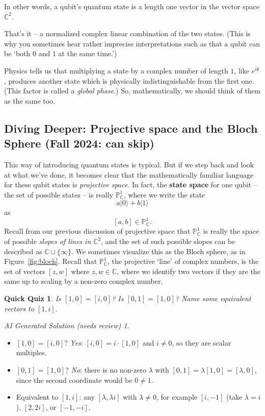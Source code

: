 \documentclass{article}
\theoremstyle{plain}
\newtheorem{quiz}[theorem]{Quick Quiz}
\theoremstyle{definition}
\theoremstyle{remark}
\newtheorem*{aisolution}{AI Generated Solution (needs review)}
\numberwithin{theorem}{section}
\newcommand{\CC}{\mathbb{C}}
\newcommand{\PP}{\mathbb{P}}
\begin{document}
In other words, a qubit's quantum state is a length one vector in the vector space $\mathbb{C}^2$.

That's it -- a normalized complex linear combination of the two states.  (This is why you sometimes hear rather imprecise interpretations such as that a qubit can be `both $0$ and $1$ at the same time.')

Physics tells us that multiplying a state by a complex number of length $1$, like $e^{i\theta}$, produces another state which is physically indistinguishable from the first one.  (This factor is called a \emph{global phase}.)  So, mathematically, we should think of them as the same too.





\subsection{Diving Deeper:  Projective space and the Bloch Sphere (Fall 2024: can skip)}
 This way of introducing quantum states is typical.  But if we step back and look at what we've done, it becomes clear that the mathematically familiar language for these qubit states is \emph{projective space}.  In fact, the \textbf{state space} for one qubit -- the set of possible states -- is really $\mathbb{P}^1_\CC$, where we write the state
\[
a |0\rangle + b |1 \rangle
\]
as 
\[
[a,b] \in \PP^1_\CC.
\]
Recall from our previous discussion of projective space that $\PP^1_\CC$ is really the space of possible \emph{slopes of lines in $\CC^2$}, and the set of such possible slopes can be described as $\CC \cup \{ \infty \}$.  We sometimes visualize this as the Bloch sphere, as in Figure~\ref{fig:bloch}.
Recall that $\mathbb{P}^1_\mathbb{C}$, the projective `line' of complex numbers, is the set of vectors $[z,w]$ where $z,w \in \mathbb{C}$, where we identify two vectors if they are the same up to scaling by a non-zero complex number.

\begin{quiz}
Is $[1,0] = [i,0]$?
Is $[0,1] = [1,0]$?
Name some equivalent vectors to $[1,i]$.
\end{quiz}
\begin{aisolution}
\begin{itemize}
\item $[1,0] = [i,0]$? \emph{Yes}: $[i,0] = i\cdot[1,0]$ and $i \neq 0$, so they are scalar multiples.
\item $[0,1] = [1,0]$? \emph{No}: there is no non-zero $\lambda$ with $[0,1] = \lambda[1,0] = [\lambda,0]$, since the second coordinate would be $0 \neq 1$.
\item Equivalent to $[1,i]$: any $[\lambda, \lambda i]$ with $\lambda \neq 0$, for example $[i,-1]$ (take $\lambda = i$), $[2,2i]$, or $[-1,-i]$.
\end{itemize}
\end{aisolution}
\end{document}
